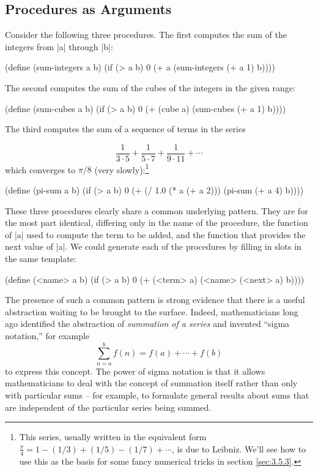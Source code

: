 \subsection{Procedures as Arguments}
\label{sec:1.3.1}

Consider the following three procedures.  The first computes the sum
of the integers from \scheme|a| through \scheme|b|:

\begin{schemedisplay}
(define (sum-integers a b)
  (if (> a b)
      0
      (+ a (sum-integers (+ a 1) b))))
\end{schemedisplay}
The second computes the sum of the cubes of the integers in the given range:

\begin{schemedisplay}
(define (sum-cubes a b)
  (if (> a b)
      0
      (+ (cube a) (sum-cubes (+ a 1) b))))
\end{schemedisplay}
The third computes the sum of a sequence of terms in the
series

\begin{displaymath}
\frac{1}{3 \cdot 5} +
\frac{1}{5 \cdot 7} +
\frac{1}{9 \cdot 11} +
\cdots
\end{displaymath}
which converges to $\pi / 8$ (very slowly):\footnote{This series,
  usually written in the equivalent form $\frac{\pi}{4} = 1 - (1/3) +
  (1/5) - (1/7) + \cdots$, is due to Leibniz.  We'll see how to use
  this as the basis for some fancy numerical tricks in section
  \ref{sec:3.5.3}.}

\begin{schemedisplay}
(define (pi-sum a b)
  (if (> a b)
      0
      (+ (/ 1.0 (* a (+ a 2))) (pi-sum (+ a 4) b))))
\end{schemedisplay}

These three procedures clearly share a common underlying pattern.
They are for the most part identical, differing only in the name of
the procedure, the function of \scheme|a| used to compute the term to be added,
and the function that provides the next value of \scheme|a|.  We could generate
each of the procedures by filling in slots in the same template:

\begin{schemedisplay}
(define (<name> a b)
  (if (> a b)
      0
      (+ (<term> a)
         (<name> (<next> a) b))))
\end{schemedisplay}

The presence of such a common pattern is strong evidence that there is
a useful abstraction waiting to be brought to the surface.  Indeed,
mathematicians long ago identified the abstraction of
\textit{summation of a series} and invented ``sigma
notation,'' for example$$\sum^b_{n=a} f(n) = f(a) + \cdots + f(b)$$
to express this concept.  The power of sigma notation is that it
allows mathematicians to deal with the concept of summation
itself rather than only with particular sums -- for example, to
formulate general results about sums that are independent of the
particular series being summed.

